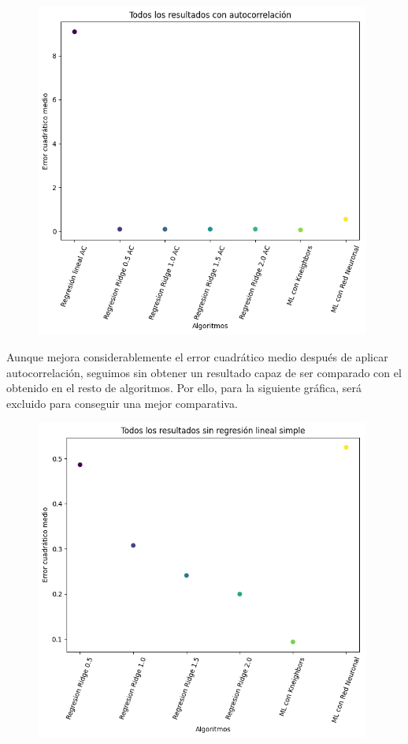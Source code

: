 \documentclass[oneside,openright,titlepage,numbers=noenddot,openany,headinclude,footinclude=true,
cleardoublepage=empty,abstractoff,BCOR=5mm,paper=a4,fontsize=12pt,main=spanish]{scrreprt}
\begin{document}
\begin{figure}[H]
	\centering
	\includegraphics[width=11cm]{Todos los resultados con autocorrelación.png}
\end{figure}

Aunque mejora considerablemente el error cuadrático medio después de aplicar autocorrelación, seguimos sin obtener un resultado capaz de ser comparado con el obtenido en el resto de algoritmos. Por ello, para la siguiente gráfica, será excluido para conseguir una mejor comparativa.

\begin{figure}[H]
	\centering
	\includegraphics[width=11cm]{Todos los resultados sin regresión lineal simple.png}
\end{figure}
\end{document}
